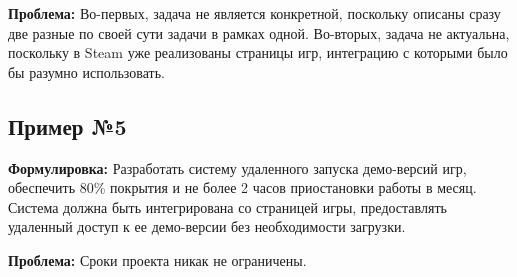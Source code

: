 \documentclass[12pt, a4paper]{article}
\begin{document}
\textbf{Проблема:} Во-первых, задача не является конкретной, поскольку описаны сразу две разные по своей сути задачи в рамках одной. Во-вторых, задача не актуальна, поскольку в Steam уже реализованы страницы игр, интеграцию с которыми было бы разумно использовать.
\subsection{Пример №5}
\textbf{Формулировка:} Разработать систему удаленного запуска демо-версий игр, обеспечить 80\% покрытия и не более 2 часов приостановки работы в месяц. Система должна быть интегрирована со страницей игры, предоставлять удаленный доступ к ее демо-версии без необходимости загрузки. 

\textbf{Проблема:} Сроки проекта никак не ограничены.
\end{document}

